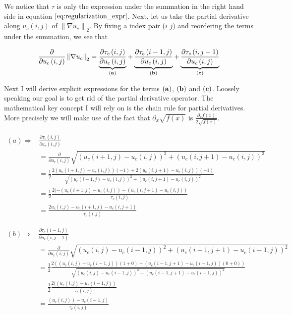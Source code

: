 \documentclass{paper}
\newcommand{\norm}[1]{\left\lVert#1\right\rVert}
\begin{document}
We notice that $\tau$ is only the expression under the summation in the right hand side in equation $\ref{eq:regularization_expr}$. Next, let us take the partial derivative along $u_{c}(i,j)$ of $\norm{\nabla{u_{c}}}_2$. By fixing a index pair ($i$ $j$) and reordering the terms under the summation, we see that 

\begin{equation}
	\frac{\partial}{\partial u_{c}\left(i,j\right)} \norm{\nabla{u_c}}_2 = \underbrace{\frac{\partial{\tau_{c}\left(i,j\right)}}{\partial u_{c}\left(i,j\right)}}_{\bf{(a)}} + \underbrace{\frac{\partial{\tau_{c}\left(i-1,j\right)}}{\partial u_{c}\left(i,j\right)}}_{\bf{(b)}} + \underbrace{\frac{\partial{\tau_{c}\left(i,j-1\right)}}{\partial u_{c}\left(i,j\right)}}_{\bf{(c)}}
\end{equation}

Next I will derive explicit expressions for the terms $\bf{(a)}$, $\bf{(b)}$ and $\bf{(c)}$. Loosely speaking our goal is to get rid of the partial derivative operator. The mathematical key concept I will rely on is the chain rule for partial derivatives. More precisely we will make use of the fact that $\partial_{x}\sqrt{f(x)}$ is $\frac{\partial_{x} f(x)}{2 \sqrt{f(x)}}$.

\begin{align}
	(a) \Longrightarrow
	& \frac{\partial{\tau_{c}\left(i,j\right)}}{\partial u_{c}\left(i,j\right)} \nonumber \\
	&= \frac{\partial}{\partial{u_{c}\left(i,j\right)}} \sqrt{ \left(u_{c}(i+1,j) - u_{c}(i,j)\right)^2 + \left(u_{c}(i,j+1) - u_{c}(i,j)\right)^2} \nonumber \\
	&= \frac{1}{2} \frac{2 (u_{c}(i+1,j)-u_{c}(i,j))(-1) + 2 (u_{c}(i,j+1)-u_{c}(i,j))(-1)}{\sqrt{ \left(u_{c}(i+1,j) - u_{c}(i,j)\right)^2 + \left(u_{c}(i,j+1) - u_{c}(i,j)\right)^2}} \nonumber \\
	&= \frac{1}{2} \frac{2 (-(u_{c}(i+1,j)-u_{c}(i,j)) - (u_{c}(i,j+1)-u_{c}(i,j))}{\tau_{c}\left(i,j\right)} \nonumber \\
	&= \frac{2 u_{c} \left(i,j\right) - u_{c} \left(i+1,j\right)-u_{c} \left(i,j+1\right)}{\tau_{c}\left(i,j\right)}
\end{align}

\begin{align}
(b) \Longrightarrow
	& \frac{\partial{\tau_{c}\left(i-1,j\right)}}{\partial u_{c}\left(i,j-1\right)} \nonumber \\
	&= \frac{\partial}{\partial{u_{c}\left(i,j\right)}} \sqrt{ \left(u_{c}(i,j) - u_{c}(i-1,j)\right)^2 + \left(u_{c}(i-1,j+1) - u_{c}(i-1,j)\right)^2} \nonumber \\
	&= \frac{1}{2} \frac{2(\left(u_{c}(i,j) - u_{c}(i-1,j)\right)(1+0) + \left(u_{c}(i-1,j+1) - u_{c}(i-1,j)\right)(0+0))}{\sqrt{ \left(u_{c}(i,j) - u_{c}(i-1,j)\right)^2 + \left(u_{c}(i-1,j+1) - u_{c}(i-1,j)\right)^2}} \nonumber \\
	&= \frac{1}{2} \frac{2(\left(u_{c}(i,j) - u_{c}(i-1,j)\right)}{\tau_{c}\left(i,j\right)} \nonumber \\
	&= \frac{\left(u_{c}(i,j)\right)-u_{c} \left(i-1,j\right)}{\tau_{c}\left(i,j\right)}
\end{align}
\end{document}
